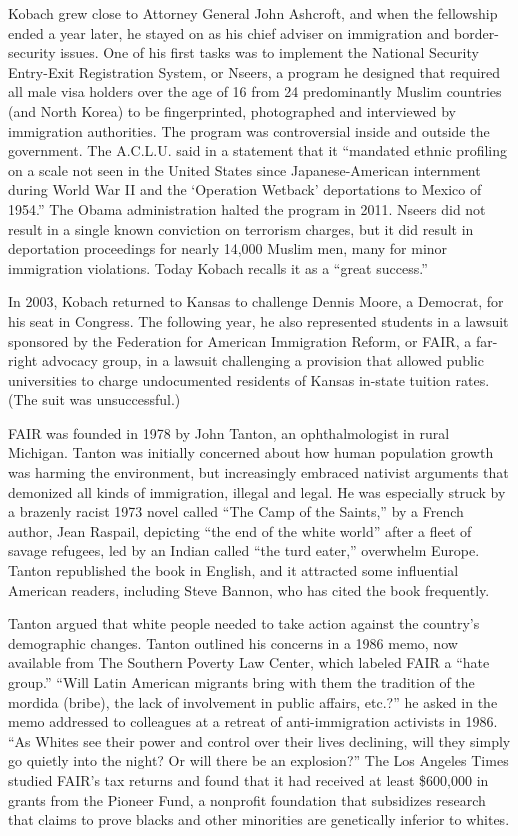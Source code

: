 Kobach grew close to Attorney General John Ashcroft, and when the
fellowship ended a year later, he stayed on as his chief adviser on
immigration and border-security issues. One of his first tasks was to
implement the National Security Entry-Exit Registration System, or
Nseers, a program he designed that required all male visa holders over
the age of 16 from 24 predominantly Muslim countries (and North Korea)
to be fingerprinted, photographed and interviewed by immigration
authorities. The program was controversial inside and outside the
government. The A.C.L.U. said in a statement that it ``mandated ethnic
profiling on a scale not seen in the United States since
Japanese-American internment during World War II and the `Operation
Wetback' deportations to Mexico of 1954.'' The Obama administration
halted the program in 2011. Nseers did not result in a single known
conviction on terrorism charges, but it did result in deportation
proceedings for nearly 14,000 Muslim men, many for minor immigration
violations. Today Kobach recalls it as a ``great success.''

In 2003, Kobach returned to Kansas to challenge Dennis Moore, a
Democrat, for his seat in Congress. The following year, he also
represented students in a lawsuit sponsored by the Federation for
American Immigration Reform, or FAIR, a far-right advocacy group, in a
lawsuit challenging a provision that allowed public universities to
charge undocumented residents of Kansas in-state tuition rates. (The
suit was unsuccessful.)

FAIR was founded in 1978 by John Tanton, an ophthalmologist in rural
Michigan. Tanton was initially concerned about how human population
growth was harming the environment, but increasingly embraced nativist
arguments that demonized all kinds of immigration, illegal and legal. He
was especially struck by a brazenly racist 1973 novel called ``The Camp
of the Saints,'' by a French author, Jean Raspail, depicting ``the end
of the white world'' after a fleet of savage refugees, led by an Indian
called ``the turd eater,'' overwhelm Europe. Tanton republished the book
in English, and it attracted some influential American readers,
including Steve Bannon, who has cited the book frequently.

Tanton argued that white people needed to take action against the
country's demographic changes. Tanton outlined his concerns in a 1986
memo, now available from The Southern Poverty Law Center, which labeled
FAIR a ``hate group.'' ``Will Latin American migrants bring with them
the tradition of the mordida (bribe), the lack of involvement in public
affairs, etc.?'' he asked in the memo addressed to colleagues at a
retreat of anti-immigration activists in 1986. ``As Whites see their
power and control over their lives declining, will they simply go
quietly into the night? Or will there be an explosion?'' The Los Angeles
Times studied FAIR's tax returns and found that it had received at least
\$600,000 in grants from the Pioneer Fund, a nonprofit foundation that
subsidizes research that claims to prove blacks and other minorities are
genetically inferior to whites.

